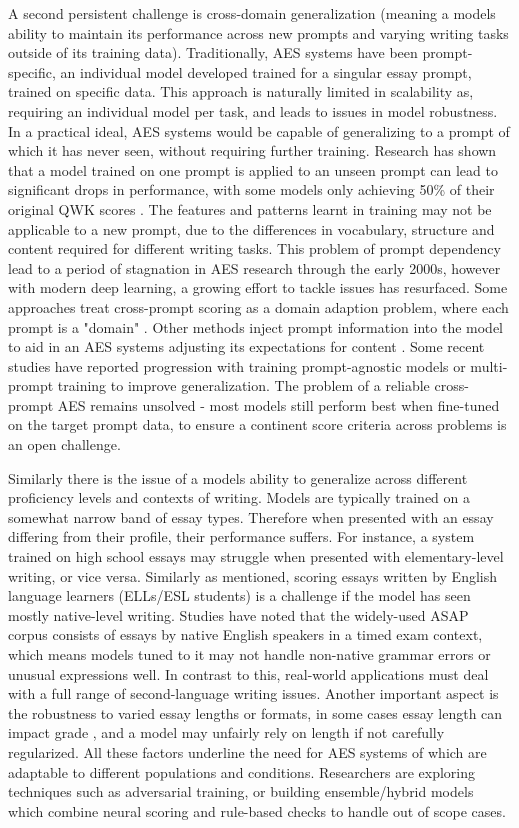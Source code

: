 \documentclass[10pt]{report}
\begin{document}
A second persistent challenge is cross-domain generalization (meaning a models ability to maintain its performance across new prompts and varying writing tasks outside of its training data). Traditionally, AES systems have been prompt-specific, an individual model developed trained for a singular essay prompt, trained on specific data. This approach is naturally limited in scalability as, requiring an individual model per task, and leads to issues in model robustness. In a practical ideal, AES systems would be capable of generalizing to a prompt of which it has never seen, without requiring further training. Research has shown that a model trained on one prompt is applied to an unseen prompt can lead to significant drops in performance, with some models only achieving 50\% of their original QWK scores \parencite{blanchard2013toefl}. The features and patterns learnt in training may not be applicable to a new prompt, due to the differences in vocabulary, structure and content required for different writing tasks. This problem of prompt dependency lead to a period of stagnation in AES research through the early 2000s, however with modern deep learning, a growing effort to tackle issues has resurfaced. Some approaches treat cross-prompt scoring as a domain adaption problem, where each prompt is a "domain" \parencite{litman2024fairness}. Other methods inject prompt information into the model to aid in an AES systems adjusting its expectations for content \parencite{blanchard2013toefl}. Some recent studies have reported progression with training prompt-agnostic models or multi-prompt training to improve generalization. The problem of a reliable cross-prompt AES remains unsolved - most models still perform best when fine-tuned on the target prompt data, to ensure a continent score criteria across problems is an open challenge. 

Similarly there is the issue of a models ability to generalize across different proficiency levels and contexts of writing. Models are typically trained on a somewhat narrow band of essay types. Therefore when presented with an essay differing from their profile, their performance suffers. For instance, a system trained on high school essays may struggle when presented with elementary-level writing, or vice versa.  Similarly as mentioned, scoring essays written by English language learners (ELLs/ESL students) is a challenge if the model has seen mostly native-level writing. Studies have noted that the widely-used ASAP corpus consists of essays by native English speakers in a timed exam context, which means models tuned to it may not handle non-native grammar errors or unusual expressions well. In contrast to this, real-world applications must deal with a full range of second-language writing issues. Another important aspect is the robustness to varied essay lengths or formats, in some cases essay length can impact grade \parencite{Sgengjie2024acl}, and a model may unfairly rely on length if not carefully regularized. All these factors underline the need for AES systems of which are adaptable to different populations and conditions. Researchers are exploring techniques such as adversarial training, or building ensemble/hybrid models which combine neural scoring and rule-based checks to handle out of scope cases.
\end{document}
